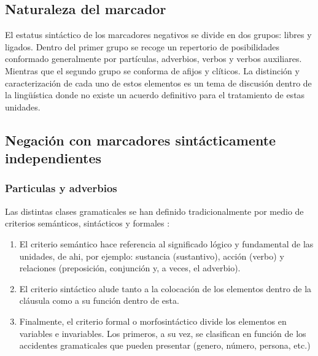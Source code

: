 \subsection*{Naturaleza del marcador}

\noindent  El estatus sintáctico de los marcadores negativos se divide en dos grupos: libres y ligados. Dentro del primer grupo se recoge un repertorio de posibilidades conformado generalmente por partículas, adverbios, verbos y verbos auxiliares. Mientras que el segundo grupo se conforma de afijos y clíticos. La distinción y caracterización de cada uno de estos elementos es un tema de discusión dentro de la lingüística donde no existe un acuerdo definitivo para el tratamiento de estas unidades.

\subsection*{Negación con marcadores sintácticamente independientes}

\subsubsection*{Particulas y adverbios}

\noindent Las distintas clases gramaticales se han definido tradicionalmente por medio de criterios semánticos, sintácticos y formales \textcolor{MidnightBlue}{\citep{asencio1981,CaleroVaquera1986}}:

\begin{enumerate}
    \item El criterio semántico hace referencia al significado lógico y fundamental de las unidades, de ahi, por ejemplo: sustancia (sustantivo), acción (verbo) y relaciones (preposición, conjunción y, a veces, el adverbio).
    \item El criterio sintáctico alude tanto a la colocación de los elementos dentro de la cláusula como a su función dentro de esta.
    \item Finalmente, el criterio formal o morfosintáctico divide los elementos en variables e invariables. Los primeros, a su vez, se clasifican en función de los accidentes gramaticales que pueden presentar (genero, número, persona, etc.)
\end{enumerate}

